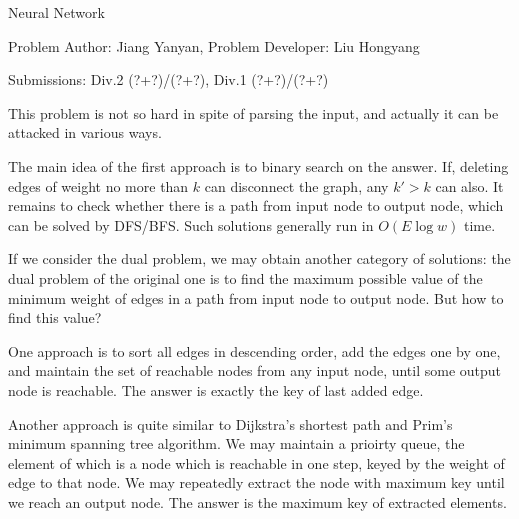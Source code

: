 \begin{Solution}{Neural Network}

\begin{frame}{\ProblemName}

\small Problem Author: Jiang Yanyan, Problem Developer: Liu Hongyang \par \vspace{0.3cm}

\small Submissions: Div.2 (?+?)/(?+?), Div.1 (?+?)/(?+?)  \par \vspace{0.5cm}

This problem is not so hard in spite of parsing the input, and actually it can be attacked in various ways. 

\pause

The main idea of the first approach is to binary search on the answer. If, deleting edges of weight no more than $k$ can disconnect the graph, any $k' > k$ can also. It remains to check whether there is a path from input node to output node, which can be solved by DFS/BFS. Such solutions generally run in $O(E \log w)$ time.

\end{frame}

\begin{frame}{\ProblemName}

If we consider the dual problem, we may obtain another category of solutions:
the dual problem of the original one is to find the maximum possible value of the minimum weight of edges in a path from input node to output node. But how to find this value?

\pause

One approach is to sort all edges in descending order, add the edges one by one, and maintain the set of reachable nodes from any input node, until some output node is reachable. The answer is exactly the key of last added edge.

\pause

Another approach is quite similar to Dijkstra's shortest path and Prim's minimum spanning tree algorithm. We may maintain a prioirty queue, the element of which is a node which is reachable in one step, keyed by the weight of edge to that node. We may repeatedly extract the node with maximum key until we reach an output node. The answer is the maximum key of extracted elements.

\end{frame}

\end{Solution}
